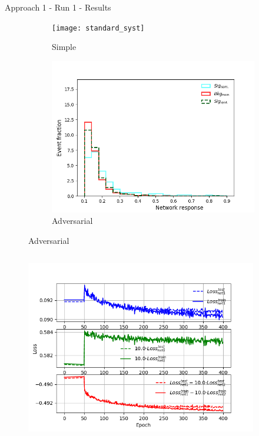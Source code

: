 \begin{frame}{Approach 1 - Run 1 - Results}
\vspace{-0.3cm}
    \begin{figure}[htbp]
    \centering
    \begin{subfigure}[b]{0.47\textwidth}
        \texttt{[image: standard\_syst]}
        \caption{Simple}
        \label{fig:simple:final:sepa}
    \end{subfigure}
\quad
    \begin{subfigure}[b]{0.47\textwidth}
        \includegraphics[width=\textwidth]{app1/full_classic_syst.png}
        \caption{Adversarial}
        \label{fig:simple:final:syst}
    \end{subfigure}
    \end{figure}
    \vspace{-0.9cm}
    \begin{columns}
    \begin{column}{0.5\textwidth}
    \begin{figure}
            \includegraphics[width=0.9\textwidth]{app1/full_classic_losses.png}

\end{figure}
\end{column}
\end{columns}
\end{frame}

